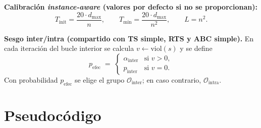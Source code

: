 \documentclass[12pt, a4paper]{article}
\begin{document}
\medskip
\noindent
\textbf{Calibración \emph{instance-aware} (valores por defecto si no se
proporcionan):}
\[
T_{\mathrm{init}} = \frac{20 \cdot d_{\max}}{n}, \qquad
T_{\mathrm{min}}  = \frac{20 \cdot d_{\max}}{n^{2}}, \qquad
L = n^{2}.
\]

\medskip
\noindent
\textbf{Sesgo inter/intra (compartido con TS simple, RTS y ABC simple).}
En cada iteración del bucle interior se calcula $v \leftarrow
\mathrm{viol}(s)$ y se define
\[
p_{\mathrm{efec}} \;=\;
\begin{cases}
  \alpha_{\mathrm{inter}} & \text{si } v > 0, \\
  p_{\mathrm{inter}}     & \text{si } v = 0.
\end{cases}
\]
Con probabilidad $p_{\mathrm{efec}}$ se elige el grupo
$\mathcal{O}_{\mathrm{inter}}$; en caso contrario,
$\mathcal{O}_{\mathrm{intra}}$.

\section{Pseudocódigo}
\end{document}
